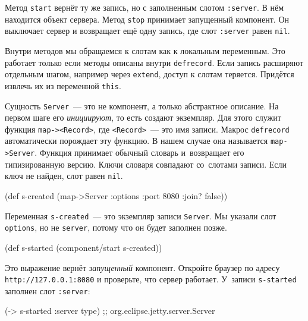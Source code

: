 Метод \verb|start| вернёт ту же запись, но с заполненным слотом
\verb|:server|. В нём находится объект сервера. Метод \verb|stop| принимает
запущенный компонент. Он выключает сервер и возвращает ещё одну запись, где слот
\verb|:server| равен \verb|nil|.


Внутри методов мы обращаемся к слотам как к локальным переменным. Это работает
только если методы описаны внутри \verb|defrecord|. Если запись расширяют
отдельным шагом, например через \verb|extend|, доступ к слотам
теряется. Придётся извлечь их из переменной \verb|this|.

Сущность \verb|Server|~--- это не компонент, а только абстрактное описание. На
первом шаге его \emph{инициируют}, то есть создают экземпляр. Для этого служит
функция \verb|map-><Record>|, где \verb|<Record>|~--- это имя записи. Макрос
\verb|defrecord| автоматически порождает эту функцию. В нашем случае она
называется \verb|map->Server|. Функция принимает обычный словарь и~возвращает
его типизированную версию. Ключи словаря совпадают со~слотами записи. Если ключ
не найден, слот равен \verb|nil|.

\begin{english}
  \begin{clojure}
(def s-created
  (map->Server {:options {:port 8080 :join? false}}))
  \end{clojure}
\end{english}

Переменная \verb|s-created|~--- это экземпляр записи \verb|Server|. Мы указали
слот \verb|options|, но не \verb|server|, потому что он будет заполнен
позже.

\begin{english}
  \begin{clojure}
(def s-started (component/start s-created))
  \end{clojure}
\end{english}

Это выражение вернёт \emph{запущенный} компонент. Откройте браузер по адресу
\verb|http://127.0.0.1:8080| и проверьте, что сервер работает. У~записи
\verb|s-started| заполнен слот \verb|:server|:

\begin{english}
  \begin{clojure}
(-> s-started :server type)
;; org.eclipse.jetty.server.Server
  \end{clojure}
\end{english}

